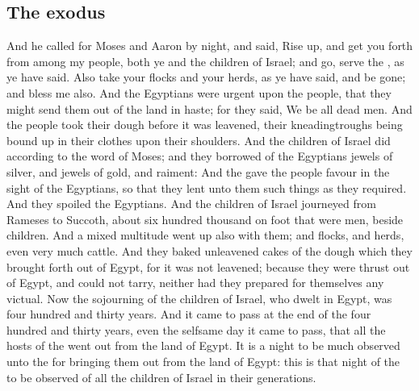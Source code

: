 \begin{biblechapter}
\section*{The exodus}
\verse And he called for Moses and Aaron by night, and said, Rise up, and get you forth from among my people, both ye and the children of Israel; and go, serve the \LORD, as ye have said.
\verse Also take your flocks and your herds, as ye have said, and be gone; and bless me also.
\verse And the Egyptians were urgent upon the people, that they might send them out of the land in haste; for they said, We be all dead men.
\verse And the people took their dough before it was leavened, their kneadingtroughs being bound up in their clothes upon their shoulders.
\verse And the children of Israel did according to the word of Moses; and they borrowed of the Egyptians jewels of silver, and jewels of gold, and raiment:
\verse And the \LORD gave the people favour in the sight of the Egyptians, so that they lent unto them such things as they required. And they spoiled the Egyptians.
\verse And the children of Israel journeyed from Rameses to Succoth, about six hundred thousand on foot that were men, beside children.
\verse And a mixed multitude went up also with them; and flocks, and herds, even very much cattle.
\verse And they baked unleavened cakes of the dough which they brought forth out of Egypt, for it was not leavened; because they were thrust out of Egypt, and could not tarry, neither had they prepared for themselves any victual.
\verse Now the sojourning of the children of Israel, who dwelt in Egypt, was four hundred and thirty years.
\verse And it came to pass at the end of the four hundred and thirty years, even the selfsame day it came to pass, that all the hosts of the \LORD went out from the land of Egypt.
\verse It is a night to be much observed unto the \LORD for bringing them out from the land of Egypt: this is that night of the \LORD to be observed of all the children of Israel in their generations.

\end{biblechapter}
